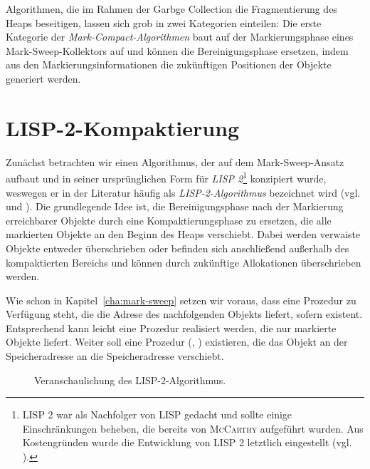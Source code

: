 Algorithmen, die im Rahmen der Garbge Collection die Fragmentierung des Heaps beseitigen, lassen sich grob in zwei Kategorien einteilen:
Die erste Kategorie der \textit{Mark-Compact-Algorithmen} baut auf der Markierungsphase eines Mark-Sweep-Kollektors auf und können die Bereinigungsphase ersetzen, indem aus den Markierungsinformationen die zukünftigen Positionen der Objekte generiert werden.







\section{LISP-2-Kompaktierung}
\label{sec:lisp2-compact}
Zunächst betrachten wir einen Algorithmus, der auf dem Mark-Sweep-Ansatz aufbaut und in seiner ursprünglichen Form für \textit{LISP 2}\footnote{LISP 2 war als Nachfolger von LISP gedacht und sollte einige Einschränkungen beheben, die bereits von \textsc{McCarthy} aufgeführt wurden. Aus Kostengründen wurde die Entwicklung von LISP 2 letztlich eingestellt (vgl. \cite{lisp-history}).} konzipiert wurde, weswegen er in der Literatur häufig als \textit{LISP-2-Algorithmus} bezeichnet wird (vgl. \cite[Kap. 3.2]{handbook} und \cite{lisp2gc}).
Die grundlegende Idee ist, die Bereinigungsphase nach der Markierung erreichbarer Objekte durch eine Kompaktierungsphase zu ersetzen, die alle markierten Objekte an den Beginn des Heaps verschiebt.
Dabei werden verwaiste Objekte entweder überschrieben oder befinden sich anschließend außerhalb des kompaktierten Bereichs und können durch zukünftige Allokationen überschrieben werden.

Wie schon in Kapitel~\ref{cha:mark-sweep} setzen wir voraus, dass eine Prozedur zu Verfügung steht, die die Adrese des nachfolgenden Objekts liefert, sofern existent.
Entsprechend kann leicht eine Prozedur  realisiert werden, die nur markierte Objekte liefert.
Weiter soll eine Prozedur (, ) existieren, die das Objekt an der Speicheradresse  an die Speicheradresse  verschiebt.

\begin{figure}[h]
	\centering
	
	\caption[LISP-2-Algorithmus]{Veranschaulichung des LISP-2-Algorithmus.}
	\label{fig:lisp2}
\end{figure}

